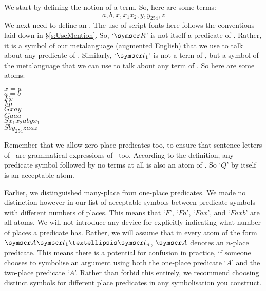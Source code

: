 We start by defining the notion of a term.
So, here are some terms:
	$$a, b, x, x_{1} x_{2}, y, y_{254}, z$$
We next need to define an .
The use of script fonts here follows the conventions laid down in §\ref{s:UseMention}. So, `$\meta{R}$' is not itself a predicate of \FOL. Rather, it is a symbol of our metalanguage (augmented English) that we use to talk about any predicate of \FOL. Similarly, `$\meta{t}_{1}$' is not a term of \FOL, but a symbol of the metalanguage that we can use to talk about any term of \FOL. So here are some atoms:
	\begin{center}
		$x = a$\\
		$a = b$\\
		$Fx$\\
		$Fa$\\
		$Gxay$\\
		$Gaaa$\\
		$Sx_{1} x_{2} a b y x_{1}$\\
		$Sby_{254} z a a z$\\
	\end{center}
Remember that we allow zero-place predicates too, to ensure that sentence letters of \TFL\ are grammatical expressions of \FOL\ too. According to the definition, any predicate symbol followed by no terms at all is also an atom of \FOL. So `$Q$' by itself is an acceptable atom.

Earlier, we distinguished many-place from one-place predicates. We made no distinction however in our list of acceptable symbols between predicate symbols with different numbers of places. This means that `$F$', `$Fa$', `$Fax$', and `$Faxb$' are all atoms. We will not introduce any device for explicitly indicating what number of places a predicate has. Rather, we will assume that in every atom of the form $\meta{A}\meta{t}_{1}…\meta{t}_{n}$, $\meta{A}$ denotes an $n$-place predicate. This means there is a potential for confusion in practice, if someone chooses to symbolise an argument using both the one-place predicate `$A$' and the two-place predicate `$A$'. Rather than forbid this entirely, we recommend choosing distinct symbols for different place predicates in any symbolisation you construct.


